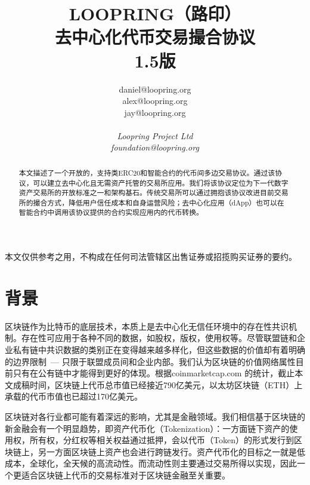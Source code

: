 \documentclass[UTF8,nofonts]{ctexart}
\title{\textbf{LOOPRING（路印）}\\\textbf{去中心化代币交易撮合协议}\\1.5版}
\author{
    daniel@loopring.org\\
    alex@loopring.org\\
    jay@loopring.org\\
    \\
  \textit{Loopring Project Ltd}\\
  \textit{foundation@loopring.org}\\
}
\begin{document}
\maketitle

本文仅供参考之用，不构成在任何司法管辖区出售证券或招揽购买证券的要约。 

\begin{abstract}
本文描述了一个开放的，支持类ERC20和智能合约的代币间多边交易协议。通过该协议，可以建立去中心化且无需资产托管的交易所应用。我们将该协议定位为下一代数字资产交易所的开放标准之一和架构基石。传统交易所可以通过拥抱该协议改进目前交易所的撮合方式，降低用户信任成本和自身运营风险；去中心化应用（dApp）也可以在智能合约中调用该协议提供的合约实现应用内的代币转换。

\end{abstract}

\newpage

\tableofcontents
\newpage

\section{背景\label{sec:background}}

区块链\cite{staff2016blockchains}\cite{swan2015blockchain}作为比特币\cite{nakamoto2008bitcoin}的底层技术，本质上是去中心化无信任环境中的存在性共识机制\cite{lamport1982byzantine}\cite{christidis2016blockchains}。存在性可应用于各种不同的数据，如股权，版权，使用权等。尽管联盟链和企业私有链中共识数据的类别正在变得越来越多样化，但这些数据的价值却有着明确的边界限制\ --- 只限于联盟成员间和企业内部。我们认为区块链的价值网络属性目前只有在公有链中才能得到更好的体现。根据coinmarketcap.com 的统计，截止本文成稿时间，区块链上代币总市值已经接近790亿美元，以太坊区块链\cite{wood2014ethereum}（ETH）上承载的代币市值也已超过170亿美元。

区块链对各行业都可能有着深远的影响，尤其是金融领域。我们相信基于区块链的新金融会有一个明显趋势，即资产代币化（Tokenization）\cite{liu2016medical}\cite{christidis2016blockchains}：一方面链下资产的使用权，所有权，分红权等相关权益通过抵押，会以代币（Token）\cite{swan2015blockchain}的形式发行到区块链上，另一方面区块链上资产也会进行跨链发行。资产代币化的目标之一就是低成本，全球化，全天候的高流动性。而流动性则主要通过交易所得以实现，因此一个更适合区块链上代币的交易标准对于区块链金融至关重要。
\end{document}
